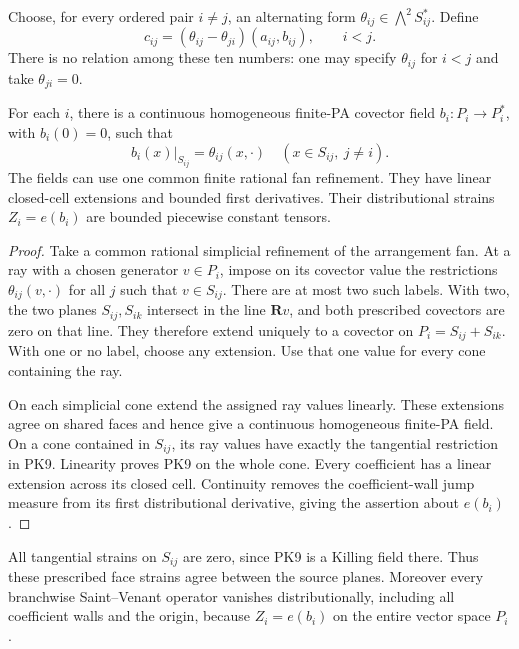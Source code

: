 Choose, for every ordered pair \(i\ne j\), an alternating form
\(\theta_{ij}\in\bigwedge^2S_{ij}^*\).  Define
\[
 c_{ij}=(\theta_{ij}-\theta_{ji})(a_{ij},b_{ij}),\qquad i<j.
 \tag{PK8}
\]
There is no relation among these ten numbers: one may specify
\(\theta_{ij}\) for \(i<j\) and take \(\theta_{ji}=0\).

\begin{lemma}
\label{lem:r13-plane-trace-realization}
For each \(i\), there is a continuous homogeneous finite-PA
covector field \(b_i:P_i\to P_i^*\), with \(b_i(0)=0\), such that
\[
             b_i(x)|_{S_{ij}}=\theta_{ij}(x,\cdot)
                    \quad(x\in S_{ij},\ j\ne i).
 \tag{PK9}
\]
The fields can use one common finite rational fan refinement.
They have linear closed-cell extensions and bounded first
derivatives.  Their distributional strains
\(Z_i=e(b_i)\) are bounded piecewise constant tensors.
\end{lemma}

\begin{proof}
Take a common rational simplicial refinement of the arrangement
fan.  At a ray with a chosen generator \(v\in P_i\), impose
on its covector value the restrictions
\(\theta_{ij}(v,\cdot)\) for all \(j\) such that
\(v\in S_{ij}\).  There are at most two such labels.  With two,
the two planes \(S_{ij},S_{ik}\) intersect in the line
\(\mathbf Rv\), and both prescribed covectors are zero on
that line.  They therefore extend uniquely to a covector on
\(P_i=S_{ij}+S_{ik}\).  With one or no label, choose any
extension.  Use that one value for every cone containing the ray.

On each simplicial cone extend the assigned ray values linearly.
These extensions agree on shared faces and hence give a
continuous homogeneous finite-PA field.  On a cone contained
in \(S_{ij}\), its ray values have exactly the tangential
restriction in PK9.  Linearity proves PK9 on the whole cone.
Every coefficient has a linear extension across its closed cell.
Continuity removes the coefficient-wall jump measure from its
first distributional derivative, giving the assertion about
\(e(b_i)\).
\end{proof}

All tangential strains on \(S_{ij}\) are zero, since PK9 is a
Killing field there.  Thus these prescribed face strains agree
between the source planes.  Moreover every branchwise
Saint--Venant operator vanishes distributionally, including all
coefficient walls and the origin, because \(Z_i=e(b_i)\) on
the entire vector space \(P_i\).

